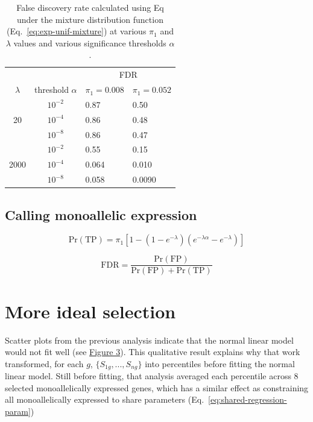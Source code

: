 \documentclass[letterpaper]{article}
\begin{document}
\begin{table}
\label{tab:fdr-exp-unif-mixture}
\begin{center}
\begin{tabular}{cc|ll|}
 & & \multicolumn{2}{c}{FDR} \\
 \(\lambda\) & threshold \(\alpha\) & \(\pi_1=0.008\) & \(\pi_1=0.052\) \\
\hline
 & \(10^{-2}\) & 0.87 & 0.50 \\
 20 & \(10^{-4}\) & 0.86 & 0.48 \\
 & \(10^{-8}\) & 0.86 & 0.47 \\
\hline
 & \(10^{-2}\) & 0.55 & 0.15 \\
 2000 & \(10^{-4}\) & 0.064 & 0.010 \\
 & \(10^{-8}\) & 0.058 & 0.0090 \\
\hline
\end{tabular}
\end{center}
\caption{False discovery rate calculated using Eq under the mixture distribution
function (Eq.~\ref{eq:exp-unif-mixture}) at various \(\pi_1\) and \(\lambda\) values and various significance
thresholds \(\alpha\).}
\end{table}

\subsection{Calling monoallelic expression}

\begin{equation}
\mathrm{Pr}(\mathrm{TP}) = \pi_1 [1 - (1 - e^{-\lambda}) (e^{-\lambda \alpha} -
e^{-\lambda})]
\end{equation}

\begin{equation}
\mathrm{FDR} = \frac{\mathrm{Pr}(\mathrm{FP})}{\mathrm{Pr}(\mathrm{FP}) + \mathrm{Pr}(\mathrm{TP})}
\end{equation}

\section{More ideal selection}
\label{sec:full-specification}

Scatter plots from the previous analysis indicate that the normal linear model
would not fit well (see
\href{https://docs.google.com/presentation/d/1YvpA1AJ-zzir1Iw0F25tO9x8gkSAzqaO4fjB7K3zBhE/edit?usp=sharing}{Figure
3}).
This qualitative result explains why that work transformed, for each \(g\),
\(\{S_{1g},...,S_{ng}\}\) into percentiles before fitting the normal linear model.  Still before fitting, that analysis averaged
each percentile across 8 selected monoallelically expressed genes, which has a similar effect as
constraining all monoallelically expressed to share parameters
(Eq.~\ref{eq:shared-regression-param})


\end{document}
